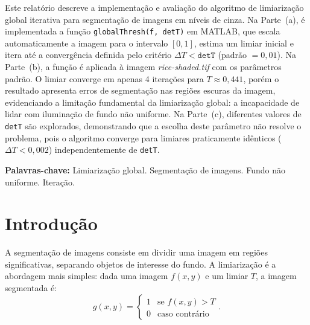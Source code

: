 \documentclass[12pt,a4paper,oneside,brazil,chapter=TITLE,section=TITLE]{abntex2}
\begin{document}
\begin{resumo}
Este relat\'orio descreve a implementa\c{c}\~ao e avalia\c{c}\~ao
do algoritmo de limiariza\c{c}\~ao global iterativa para segmenta\c{c}\~ao
de imagens em n\'iveis de cinza.
Na Parte~(a), \'e implementada a fun\c{c}\~ao \texttt{globalThresh(f,~detT)}
em MATLAB, que escala automaticamente a imagem para o intervalo $[0,1]$,
estima um limiar inicial e itera at\'e a converg\^encia definida pelo
crit\'erio $\Delta T < \texttt{detT}$ (padr\~ao $= 0{,}01$).
Na Parte~(b), a fun\c{c}\~ao \'e aplicada \`a imagem
\textit{rice-shaded.tif} com os par\^ametros padr\~ao.
O limiar converge em apenas 4 itera\c{c}\~oes para $T \approx 0{,}441$,
por\'em o resultado apresenta erros de segmenta\c{c}\~ao nas regi\~oes
escuras da imagem, evidenciando a limita\c{c}\~ao fundamental da
limiariza\c{c}\~ao global: a incapacidade de lidar com ilumina\c{c}\~ao
de fundo n\~ao uniforme.
Na Parte~(c), diferentes valores de \texttt{detT} s\~ao explorados,
demonstrando que a escolha deste par\^ametro n\~ao resolve o problema,
pois o algoritmo converge para limiares praticamente id\^enticos
($\Delta T < 0{,}002$) independentemente de \texttt{detT}.

\vspace{0.5cm}
\noindent\textbf{Palavras-chave:}
Limiariza\c{c}\~ao global.
Segmenta\c{c}\~ao de imagens.
Fundo n\~ao uniforme.
Itera\c{c}\~ao.
\end{resumo}

\tableofcontents*
\cleardoublepage
\textual

\chapter{Introdu\c{c}\~ao}

A segmenta\c{c}\~ao de imagens consiste em dividir uma imagem em
regi\~oes significativas, separando objetos de interesse do fundo.
A limiariza\c{c}\~ao \'e a abordagem mais simples: dada uma imagem
$f(x,y)$ e um limiar $T$, a imagem segmentada \'e:
\begin{equation}
  g(x,y) = \begin{cases} 1 & \text{se } f(x,y) > T \\ 0 & \text{caso contr\'ario} \end{cases}.
\end{equation}
\end{document}
